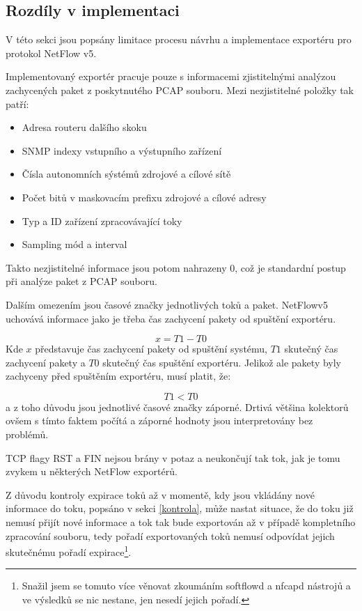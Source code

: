 \documentclass[11pt, a4paper, hidelinks]{article}[08.10.2023]
\begin{document}
    \subsection{Rozdíly v implementaci}\label{limitace}
    V této sekci jsou popsány limitace procesu návrhu a implementace exportéru pro protokol NetFlow v5. 
    
    Implementovaný exportér pracuje pouze s informacemi zjistitelnými analýzou zachycených paket z poskytnutého PCAP souboru.
    Mezi nezjistitelné položky tak patří:

    \begin{itemize}
        \item{Adresa routeru dalšího skoku}
        \item{SNMP indexy vstupního a výstupního zařízení}
        \item{Čísla autonomních sýstémů zdrojové a cílové sítě}
        \item{Počet bitů v maskovacím prefixu zdrojové a cílové adresy}
        \item{Typ a ID zařízení zpracovávající toky}
        \item{Sampling mód a interval}
    \end{itemize}

    Takto nezjistitelné informace jsou potom nahrazeny 0, což je standardní postup při analýze paket z PCAP souboru.

    Dalším omezením jsou časové značky jednotlivých toků a paket. NetFlowv5 uchovává informace jako je třeba čas zachycení pakety od spuštění exportéru.


    \begin{equation}
        x = T1 - T0
    \end{equation}
    Kde $x$ představuje čas zachycení pakety od spuštění systému, $T1$ skutečný čas zachycení pakety a $T0$ skutečný čas spuštění exportéru.
    Jelikož ale pakety byly zachyceny před spuštěním exportéru, musí platit, že:

    \begin{equation}
        T1 < T0
    \end{equation}
    a z toho důvodu jsou jednotlivé časové značky záporné. Drtivá většina kolektorů ovšem s tímto faktem počítá a záporné hodnoty jsou interpretovány bez problémů.

    TCP flagy RST a FIN nejsou brány v potaz a neukončují tak tok, jak je tomu zvykem u některých NetFlow exportérů.

    Z důvodu kontroly expirace toků až v momentě, kdy jsou vkládány nové informace do toku, popsáno v sekci \ref{kontrola}, může nastat situace, že do toku již nemusí přijít nové informace a tok tak bude exportován až v případě kompletního zpracování souboru, tedy pořadí exportovaných toků nemusí odpovídat jejich skutečnému pořadí expirace\footnote{Snažil jsem se tomuto více věnovat zkoumáním softflowd a nfcapd nástrojů a ve výsledků se nic nestane, jen nesedí jejich pořadí.}.
    
\end{document}
